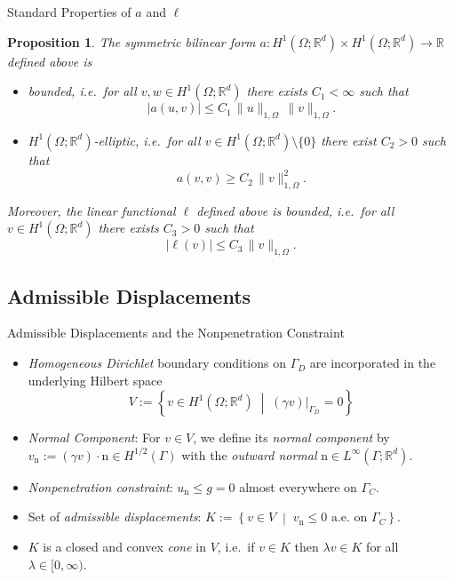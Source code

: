 \documentclass[10pt,aspectratio=169]{beamer}
\newtheorem{proposition}{Proposition}[section]
\def\R{{\mathbb R}}
\begin{document}
\begin{frame}{Standard Properties of $a$ and $\ell$}
	\begin{proposition}
		The symmetric bilinear form $a:H^1(\Omega;\R^d)\times H^1(\Omega;\R^d)\to \R$ defined above is
		\begin{itemize}
			\item[i)] {\em bounded}, i.e.\ for all $v,w\in H^1(\Omega;\R^d)$ there exists $C_1<\infty$ such that
			      \begin{equation*}
				      |a(u,v)|\le C_1\,\|u\|_{1,\Omega}\,\|v\|_{1,\Omega}.
			      \end{equation*}
			\item[ii)] $H^1(\Omega;\R^d)${\em -elliptic}, i.e.\ for all $v\in H^1(\Omega;\R^d)\setminus\{0\}$ there exist $C_2>0$ such that
			      \begin{equation*}
				      a(v,v)\ge C_2\,\|v\|_{1,\Omega}^2.
			      \end{equation*}
		\end{itemize}
		Moreover, the linear functional $\ell$ defined above is {\em bounded}, i.e.\ for all $v\in H^1(\Omega;\R^d)$ there exists $C_3>0$ such that
		\begin{equation*}
			|\ell (v)|\le C_3\,\|v\|_{1,\Omega}.
		\end{equation*}
	\end{proposition}
\end{frame}

\subsection{Admissible Displacements}

\begin{frame}{Admissible Displacements and the Nonpenetration Constraint}
	\begin{itemize}
		\item {\em Homogeneous Dirichlet} boundary conditions on $\Gamma_D$ are incorporated in the underlying Hilbert space
		      \begin{equation*}
			      V:=\left\{ v\in H^1(\Omega;\R^d)\;\middle|\; (\gamma v)|_{\Gamma_D}=0\right\}
		      \end{equation*}
		\item {\em Normal Component}: For $v\in V$, we define its {\em normal component} by $v_\mathrm{n}:= (\gamma v)\cdot \mathrm{n}\in H^{1/2}(\Gamma)$ with the {\em outward normal} $\mathrm{n}\in L^\infty(\Gamma;\R^d)$.
		\item {\em Nonpenetration constraint}: $u_\mathrm{n}\le g = 0$ almost everywhere on $\Gamma_C$.
		\item Set of {\em admissible displacements}: $K := \left\{ v\in V\;\middle|\; v_{\mathrm n}\le 0 \text{ a.e.\ on }\Gamma_C\right\}$.
		\item $K$ is a closed and convex {\em cone} in $V$, i.e.\ if $v\in K$ then $\lambda v\in K$ for all $\lambda\in [0,\infty)$.
	\end{itemize}
	\begin{figure}[!h]
		\centering
		
	\end{figure}
\end{frame}
\end{document}

